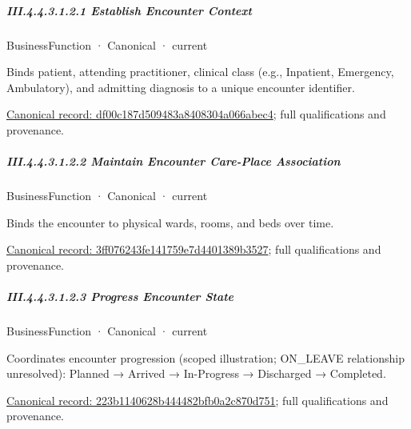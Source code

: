 \subparagraph*{III.4.4.3.1.2.1 Establish Encounter Context}
\label{navigation:III.4.4.3.1.2.1}

\label{element:df00c187d509483a8408304a066abec4}
{\small BusinessFunction · Canonical · current}\par

Binds patient, attending practitioner, clinical class (e.g., Inpatient, Emergency, Ambulatory), and admitting diagnosis to a unique encounter identifier.


{\footnotesize \href{../../../../continuum/business/business-function/df00c187d509483a8408304a066abec4.md}{Canonical record: df00c187d509483a8408304a066abec4}; full qualifications and provenance.}\par
\subparagraph*{III.4.4.3.1.2.2 Maintain Encounter Care-Place Association}
\label{navigation:III.4.4.3.1.2.2}

\label{element:3ff076243fe141759e7d4401389b3527}
{\small BusinessFunction · Canonical · current}\par

Binds the encounter to physical wards, rooms, and beds over time.


{\footnotesize \href{../../../../continuum/business/business-function/3ff076243fe141759e7d4401389b3527.md}{Canonical record: 3ff076243fe141759e7d4401389b3527}; full qualifications and provenance.}\par
\subparagraph*{III.4.4.3.1.2.3 Progress Encounter State}
\label{navigation:III.4.4.3.1.2.3}

\label{element:223b1140628b444482bfb0a2c870d751}
{\small BusinessFunction · Canonical · current}\par

Coordinates encounter progression (scoped illustration; ON\_LEAVE relationship unresolved): Planned → Arrived → In-Progress → Discharged → Completed.


{\footnotesize \href{../../../../continuum/business/business-function/223b1140628b444482bfb0a2c870d751.md}{Canonical record: 223b1140628b444482bfb0a2c870d751}; full qualifications and provenance.}\par
